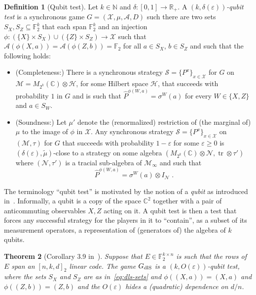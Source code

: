 \documentclass[11pt]{article}
\newtheorem{theorem}{Theorem}[section]
\theoremstyle{definition}
\newtheorem{definition}[theorem]{Definition}
\newcommand{\strategy}{\mathscr{S}}
\newcommand{\Id}{\ensuremath{I}}
\newcommand{\field}{\mathbb{F}_2}
\newcommand{\C}{\ensuremath{\mathbb{C}}}
\newcommand{\N}{\ensuremath{\mathbb{N}}}
\newcommand{\dlS}{\ensuremath{\rm dlS}}
\newcommand{\F}{\ensuremath{\mathbb{F}}}
\newcommand{\R}{\ensuremath{\mathbb{R}}}
\newcommand{\mA}{\ensuremath{\mathcal{A}}}
\newcommand{\mH}{\ensuremath{\mathcal{H}}}
\newcommand{\mM}{\ensuremath{\mathcal{M}}}
\newcommand{\mX}{\ensuremath{\mathcal{X}}}
\newcommand{\eps}{\varepsilon}
\newcommand{\mN}{\mathcal{N}}
\DeclareMathOperator{\tr}{tr}
\begin{document}
\begin{definition}[Qubit test]
Let $k\in \N$ and $\delta:[0,1]\to\R_+$. 
A \emph{$(k,\delta(\eps))$-qubit test} is a synchronous game $G=(\mX,\mu,\mA,D)$ such there are two sets $S_X,S_Z\subseteq \field^k$ that each span $\field^k$ and an injection $\phi:(\{X\}\times S_X) \cup (\{Z\}\times S_Z) \to \mX$ such that $\mA(\phi({X},a))=\mA(\phi({Z},b))=\field$ for all $a\in S_X$, $b\in S_Z$ and such that the following holds:
\begin{itemize}
\item (Completeness:) There is a synchronous strategy $\strategy = \{P^{x}\}_{x \in \mX}$ for $G$ on $\mM=M_{2^{k}}(\C)\otimes \mH$, for some Hilbert space $\mH$, that succeeds with probability $1$ in $G$ and is such that $\widehat{P}^{\phi({W},a)} = \sigma^W(a)$ for every $W\in\{X,Z\}$ and $a\in S_W$. 
\item (Soundness:) Let $\mu'$ denote the (renormalized) restriction of (the marginal of) $\mu$ to the image of $\phi$ in $\mX$.
Any synchronous strategy  $\strategy = \{P^{x}\}_{x \in \mX}$ on $(\mM,\tau)$ for $G$ that succeeds with probability $1-\eps$ for some $\eps\geq 0$ is $(\delta(\eps),\tilde{\mu})$-close to a strategy on some algebra $(M_{2^{k}}(\C)\otimes \mN,\tr\otimes \tau')$ where $(\mN,\tau')$ is a tracial sub-algebra of $\mM_\infty$ and such that
\[\widehat{P}^{\phi({W},a)} = \sigma^W(a)\otimes \Id_\mN\;.\]
\end{itemize}
\end{definition}

The terminology ``qubit test'' is motivated by the notion of a \emph{qubit} as introduced in~\cite{chao2017overlapping}. Informally, a qubit is a copy of the space $\C^2$ together with a pair of anticommuting observables $X,Z$ acting on it. A qubit test is then a test that forces any successful strategy for the players in it to ``contain'', as a subset of its measurement operators, a representation of (generators of) the algebra of $k$ qubits. 

\begin{theorem}[Corollary 3.9 in~\cite{de2022spectral}]\label{thm:dls-braid}
Suppose that $E\in \F_2^{k\times n}$ is such that the rows of $E$ span an $[n,k,d]_2$ linear code. The game $G_{\dlS}$ is a $(k,O(\eps))$-qubit test, where the sets $S_X$ and $S_Z$ are as in~\eqref{eq:dls-sets} and $\phi((X,a))=(X,a)$ and $\phi((Z,b))=(Z,b)$ and the $O(\eps)$ hides a (quadratic) dependence on $d/n$.  
\end{theorem}
\end{document}
